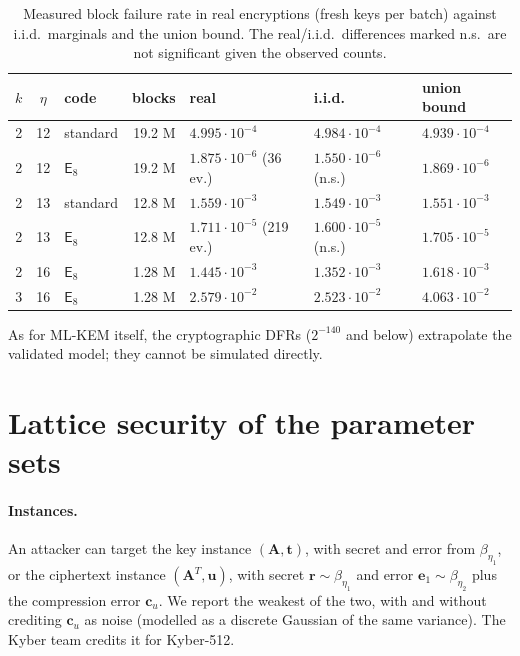 \documentclass[11pt,a4paper]{article}
\theoremstyle{definition}
\theoremstyle{remark}
\newcommand{\E}{\mathsf{E}_8}
\begin{document}
\begin{table}[t]\centering\small
\caption{Measured block failure rate in real encryptions (fresh keys per batch) against i.i.d.\ marginals and the union bound. The real/i.i.d.\ differences marked n.s.\ are not significant given the observed counts.}\label{tab:valid}
\begin{tabular}{cclrlll}\toprule
$k$ & $\eta$ & code & blocks & real & i.i.d. & union bound\\\midrule
2 & 12 & standard & 19.2 M & $4.995\cdot10^{-4}$ & $4.984\cdot10^{-4}$ & $4.939\cdot10^{-4}$\\
2 & 12 & $\E$ & 19.2 M & $1.875\cdot10^{-6}$ (36 ev.) & $1.550\cdot10^{-6}$ (n.s.) & $1.869\cdot10^{-6}$\\
2 & 13 & standard & 12.8 M & $1.559\cdot10^{-3}$ & $1.549\cdot10^{-3}$ & $1.551\cdot10^{-3}$\\
2 & 13 & $\E$ & 12.8 M & $1.711\cdot10^{-5}$ (219 ev.) & $1.600\cdot10^{-5}$ (n.s.) & $1.705\cdot10^{-5}$\\
2 & 16 & $\E$ & 1.28 M & $1.445\cdot10^{-3}$ & $1.352\cdot10^{-3}$ & $1.618\cdot10^{-3}$\\
3 & 16 & $\E$ & 1.28 M & $2.579\cdot10^{-2}$ & $2.523\cdot10^{-2}$ & $4.063\cdot10^{-2}$\\\bottomrule
\end{tabular}
\end{table}

As for ML-KEM itself, the cryptographic DFRs ($2^{-140}$ and below) extrapolate the validated model; they cannot be simulated directly.

\section{Lattice security of the parameter sets}\label{sec:sec}

\paragraph{Instances.} An attacker can target the key instance $(\mathbf A,\mathbf t)$, with secret and error from $\beta_{\eta_1}$, or the ciphertext instance $(\mathbf A^T,\mathbf u)$, with secret $\mathbf r\sim\beta_{\eta_1}$ and error $\mathbf e_1\sim\beta_{\eta_2}$ plus the compression error $\mathbf c_u$. We report the weakest of the two, with and without crediting $\mathbf c_u$ as noise (modelled as a discrete Gaussian of the same variance). The Kyber team credits it for Kyber-512.
\end{document}
